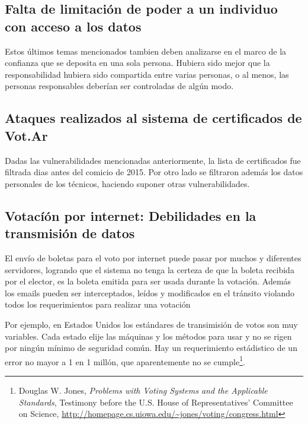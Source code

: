 \subsection{Falta de limitación de poder a un individuo con acceso a los datos}

Estos últimos temas mencionados tambien deben analizarse en el marco de la confianza que se deposita en una sola persona. Hubiera sido mejor que la responsabilidad hubiera sido compartida entre varias personas, o al menos, las personas responsables deberían ser controladas de algún modo.

\subsection{Ataques realizados al sistema de certificados de Vot.Ar}
Dadas las vulnerabilidades mencionadas anteriormente, la lista de certificados fue filtrada dias antes del comicio de 2015. Por otro lado se filtraron además los datos personales de los técnicos, haciendo suponer otras vulnerabilidades.

\subsection{Votacíón por internet: Debilidades en la transmisión de datos}
El envío de boletas para el voto por internet puede pasar por muchos y diferentes servidores, logrando que el sistema no tenga la certeza de que la boleta recibida por el elector, es la boleta emitida para ser usada durante la votación. Además los emails pueden ser interceptados, leídos y modificados en el tránsito violando todos los requerimientos para realizar una votación

Por ejemplo, en Estados Unidos los estándares de transimisión de votos son muy variables. Cada estado elije las máquinas y los métodos para usar y no se rigen por ningún mínimo de seguridad común. Hay un requerimiento estádistico de un error no mayor a 1 en 1 millón, que aparentemente no se cumple\footnote{Douglas W. Jones, \textit{Problems with Voting Systems and the Applicable Standards}, Testimony before the U.S. House of Representatives' Committee on Science, \url{http://homepage.cs.uiowa.edu/~jones/voting/congress.html}}.
